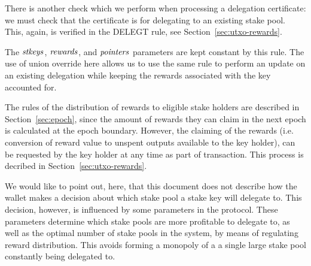 There is another check which we perform when processing a delegation certificate:
we must check that the certificate is for delegating to an
existing stake pool. This, again, is verified in the DELEGT rule, see
Section~\ref{sec:utxo-rewards}.

The $\mathit{stkeys}$, $\mathit{rewards}$, and $\mathit{pointers}$ parameters are kept constant by
this rule. The use of union override here allows us to use the same rule
to perform an update on an existing delegation while keeping the rewards
associated with the key accounted for.

The rules of the distribution of rewards to eligible stake holders are described
in Section~\ref{sec:epoch}, since the amount of rewards they can claim in the next
epoch is calculated at the epoch boundary. However, the claiming of the rewards
(i.e. conversion of reward value to unspent outputs available to the key
holder), can be requested by the key holder at any time as part of transaction.
This process is decribed in Section~\ref{sec:utxo-rewards}.

We would like to point out, here, that this document does not describe
how the wallet makes a decision about which stake pool a stake key will
delegate to. This decision, however, is influenced by some parameters in the
protocol. These parameters determine which stake pools are more profitable
to delegate to, as well as the optimal number of stake pools in the system,
by means of regulating reward distribution.
This avoids forming a monopoly of a a single large stake pool constantly
being delegated to.


